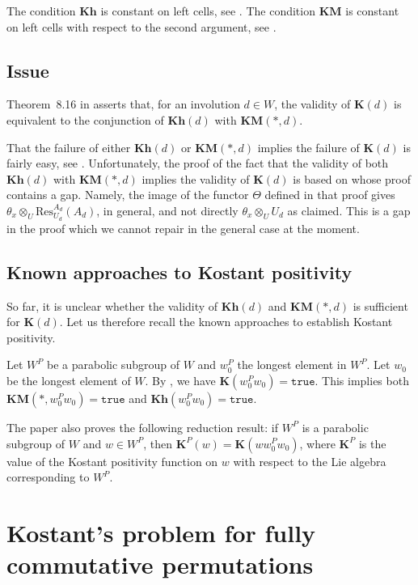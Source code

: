\documentclass[a4paper]{amsart}
\begin{document}
The condition $\mathbf{Kh}$ is constant on left cells,
see \cite[Proposition~22]{CM}.
The condition $\mathbf{KM}$ is constant on left
cells with respect to  the second argument, see \cite[Proposition~2]{CMZ}.

\subsection{Issue}\label{s3.6}

Theorem~8.16 in \cite{KMM} asserts that, for an involution
$d\in W$, the validity of $\mathbf{K}(d)$ is equivalent to
the conjunction of $\mathbf{Kh}(d)$ with $\mathbf{KM}(*,d)$.

That the failure of either $\mathbf{Kh}(d)$ or 
$\mathbf{KM}(*,d)$ implies the failure of $\mathbf{K}(d)$
is fairly easy, see \cite[Proposition~8.14]{KMM}. 
Unfortunately, the proof of the fact that 
the validity of both $\mathbf{Kh}(d)$ with $\mathbf{KM}(*,d)$
implies the validity of $\mathbf{K}(d)$ is based on 
\cite[Proposition~8.15]{KMM} whose proof
contains a gap. Namely, the image of the functor $\Theta$
defined in that proof gives 
$\theta_x\otimes_U \mathrm{Res}^{A_d}_{U_d}(A_d)$,
in general, and not directly 
$\theta_x\otimes_U U_d$ as claimed.
This is a gap in the proof which we cannot repair in the general case
at the moment.

\subsection{Known approaches to Kostant positivity}\label{s3.7}

So far, it is unclear whether the validity of
$\mathbf{Kh}(d)$ and $\mathbf{KM}(*,d)$
is sufficient for $\mathbf{K}(d)$.
Let us therefore recall the known approaches
to establish Kostant positivity.

Let $W^P$ be a parabolic subgroup of $W$ and
$w_0^P$ the longest element in $W^P$. 
Let $w_0$ be the longest element of $W$.
By \cite{GJ}, we have $\mathbf{K}(w_0^Pw_0)=\mathtt{true}$.
This implies both $\mathbf{KM}(*,w_0^Pw_0)=\mathtt{true}$
and $\mathbf{Kh}(w_0^Pw_0)=\mathtt{true}$.

The paper \cite{Kh} also proves the following reduction result:
if $W^P$ is a parabolic subgroup of $W$ and $w\in W^P$,
then $\mathbf{K}^P(w)=\mathbf{K}(ww_0^Pw_0)$, where
$\mathbf{K}^P$ is the value of the Kostant positivity 
function on $w$ with respect to
the Lie algebra corresponding to $W^P$.


\section{Kostant's problem for fully commutative permutations}\label{s4}
\end{document}
